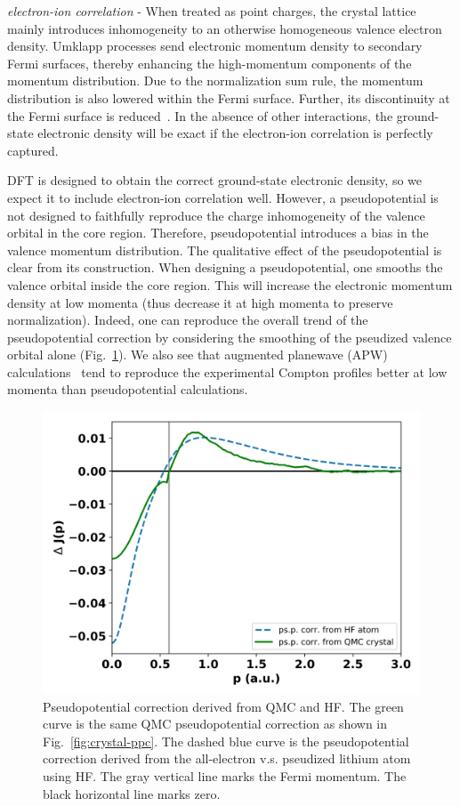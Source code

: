 \documentclass[aps,prb,showpacs,preprintnumbers,amsmath,amssymb,superscriptaddress,twocolumn]{revtex4}
\begin{document}
\emph{electron-ion correlation} - When treated as point charges, the crystal lattice mainly introduces inhomogeneity to an otherwise homogeneous valence electron density. Umklapp processes send electronic momentum density to secondary Fermi surfaces, thereby enhancing the high-momentum components of the momentum distribution. Due to the normalization sum rule, the momentum distribution is also lowered within the Fermi surface. Further, its discontinuity at the Fermi surface is reduced~\cite{P.EisenbergerL.LamP.M.Platzman1972}. In the absence of other interactions, the ground-state electronic density will be exact if the electron-ion correlation is perfectly captured.

DFT is designed to obtain the correct ground-state electronic density, so we expect it to include electron-ion correlation well. However, a pseudopotential is not designed to faithfully reproduce the charge inhomogeneity of the valence orbital in the core region. Therefore, pseudopotential introduces a bias in the valence momentum distribution. The qualitative effect of the pseudopotential is clear from its construction. When designing a pseudopotential, one smooths the valence orbital inside the core region. This will increase the electronic momentum density at low momenta (thus decrease it at high momenta to preserve normalization). Indeed, one can reproduce the overall trend of the pseudopotential correction by considering the smoothing of the pseudized valence orbital alone (Fig.~\ref{fig:hf-ppc}). We also see that augmented planewave (APW) calculations~\cite{Baruah1999,Bross2004,Bross2005,Bross2012} tend to reproduce the experimental Compton profiles better at low momenta than pseudopotential calculations.

\begin{figure}
\includegraphics[scale=0.48]{figures/li42c_bfd-ppc}
\caption{Pseudopotential correction derived from QMC and HF. The green curve is the same QMC pseudopotential correction as shown in Fig.~\ref{fig:crystal-ppc}. The dashed blue curve is the pseudopotential correction derived from the all-electron v.s. pseudized lithium atom using HF. The gray vertical line marks the Fermi momentum. The black horizontal line marks zero.\label{fig:hf-ppc}}
\end{figure}
\end{document}
